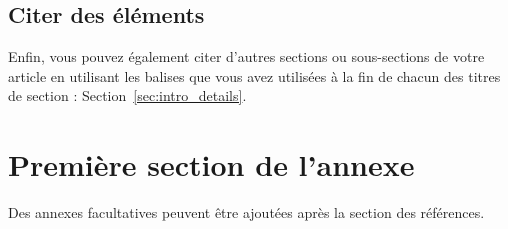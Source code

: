\documentclass[fra]{anthology-ch}         %
\begin{document}
\subsection{Citer des éléments}

Enfin, vous pouvez également citer d'autres sections ou sous-sections de
votre article en utilisant les balises que vous avez utilisées à la fin
de chacun des titres de section : Section~\ref{sec:intro_details}.

\printbibliography

\appendix

\section{Première section de l'annexe} \label{appdx:first}

Des annexes facultatives peuvent être ajoutées après la section des références. 
\end{document}
